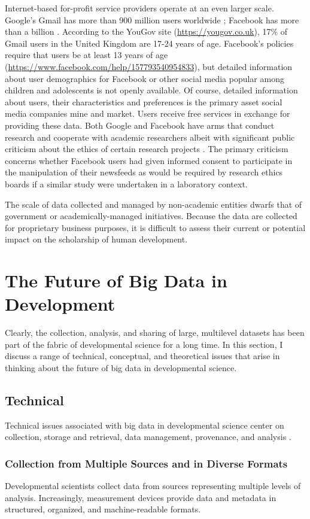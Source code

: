 \documentclass[letterpaper,man,apacite,natbib]{apa6}
\begin{document}
Internet-based for-profit service providers operate at an even larger scale.
Google's Gmail has more than 900 million users worldwide \cite{lardinois_gmail_2015}; Facebook has more than a billion \cite{facebook_2014}.
According to the YouGov site (\url{https://yougov.co.uk}), 17\% of Gmail users in the United Kingdom are 17-24 years of age.
Facebook's policies require that users be at least 13 years of age (\url{https://www.facebook.com/help/157793540954833}), but detailed information about user demographics for Facebook or other social media popular among children and adolescents is not openly available.
Of course, detailed information about users, their characteristics and preferences is the primary asset social media companies mine and market.
Users receive free services in exchange for providing these data.
Both Google and Facebook have arms that conduct research and cooperate with academic researchers albeit with significant public criticism about the ethics of certain research projects \cite{meyer_everything_2014}.
The primary criticism concerns whether Facebook users had given informed consent to participate in the manipulation of their newsfeeds as would be required by research ethics boards if a similar study were undertaken in a laboratory context.

The scale of data collected and managed by non-academic entities dwarfs that of government or academically-managed initiatives.
Because the data are collected for proprietary business purposes, it is difficult to assess their current or potential impact on the scholarship of human development.
\section{The Future of Big Data in Development}
Clearly, the collection, analysis, and sharing of large, multilevel datasets has been part of the fabric of developmental science for a long time.
In this section, I discuss a range of technical, conceptual, and theoretical issues that arise in thinking about the future of big data in developmental science. 
\subsection{Technical}
Technical issues associated with big data in developmental science center on collection, storage and retrieval, data management, provenance, and analysis \cite{goodman_ten_2014}. 
\subsubsection{Collection from Multiple Sources and in Diverse Formats}
Developmental scientists collect data from sources representing multiple levels of analysis.
Increasingly, measurement devices provide data and metadata in structured, organized, and machine-readable formats.
\end{document}
